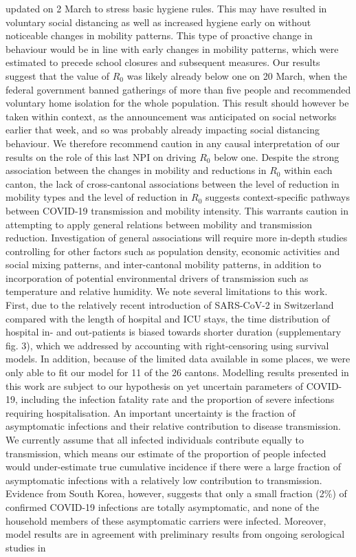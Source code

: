 updated on 2 March to stress basic hygiene rules\cite{OFSP:NouvellesReglesHygiene:2020}. This may have resulted in voluntary social distancing as well as increased hygiene early on without noticeable changes in mobility patterns. This type of proactive change in behaviour would be in line with early changes in mobility patterns, which were estimated to precede school closures and subsequent measures. Our results suggest that the value of $R_0$ was likely already below one on 20 March, when the federal government banned gatherings of more than five people and recommended voluntary home isolation for the whole population. This result should however be taken within context, as the announcement was anticipated on social networks earlier that week, and so was probably already impacting social distancing behaviour. We therefore recommend caution in any causal interpretation of our results on the role of this last NPI on driving $R_0$ below one. Despite the strong association between the changes in mobility and reductions in $R_0$ within each canton, the lack of cross-cantonal associations between the level of reduction in mobility types and the level of reduction in $R_0$ suggests context-specific pathways between COVID-19 transmission and mobility intensity. This warrants caution in attempting to apply general relations between mobility and transmission reduction. Investigation of general associations will require more in-depth studies controlling for other factors such as population density, economic activities and social mixing patterns, and inter-cantonal mobility patterns, in addition to incorporation of potential environmental drivers of transmission such as temperature and relative humidity\cite{Neher:PotentialImpactSeasonal:2020, Kissler:ProjectingTransmissionDynamics:2020}. We note several limitations to this work. First, due to the relatively recent introduction of SARS-CoV-2 in Switzerland compared with the length of hospital and ICU stays, the time distribution of hospital in- and out-patients is biased towards shorter duration (supplementary fig. 3), which we addressed by accounting with right-censoring using survival models. In addition, because of the limited data available in some places, we were only able to fit our model for 11 of the 26 cantons. Modelling results presented in this work are subject to our hypothesis on yet uncertain parameters of COVID-19, including the infection fatality rate and the proportion of severe infections requiring hospitalisation. An important uncertainty is the fraction of asymptomatic infections and their relative contribution to disease transmission. We currently assume that all infected individuals contribute equally to transmission, which means our estimate of the proportion of people infected would under-estimate true cumulative incidence if there were a large fraction of asymptomatic infections with a relatively low contribution to transmission. Evidence from South Korea, however, suggests that only a small fraction (2\%) of confirmed COVID-19 infections are totally asymptomatic, and none of the household members of these asymptomatic carriers were infected\cite{Park:EarlyReleaseCoronavirus:2020}. Moreover, model results are in agreement with preliminary results from ongoing serological studies in 